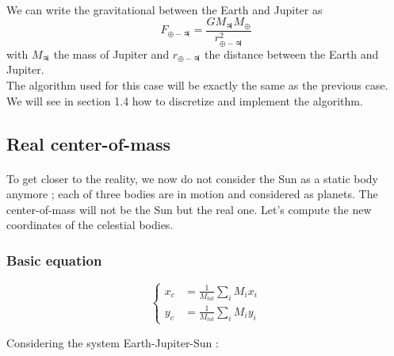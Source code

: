 \documentclass[a4paper, twoside, 11pt]{report}
\theoremstyle{theorem}
\theoremstyle{remark}
\theoremstyle{exemple}
\begin{document}
        \paragraph{}We can write the gravitational between the Earth and Jupiter as 
                \begin{equation*}
                    F_{\oplus-\jupiter} = \frac{GM_{\jupiter}M_{\oplus}}{r_{\oplus-\jupiter}^2} 
                \end{equation*}
            with $M_{\jupiter}$ the mass of Jupiter and $r_{\oplus - \jupiter}$ the distance between the Earth and Jupiter. \\
            The algorithm used for this case will be exactly the same as the previous case. We will see in section 1.4 how to discretize and implement the algorithm. 
            
        \subsection{Real center-of-mass}
        
            \paragraph{}To get closer to the reality, we now do not consider the Sun as a static body anymore ; each of three bodies are in motion and considered as planets. The center-of-mass will not be the Sun but the real one. Let's compute the new coordinates of the celestial bodies.
            
            \subsubsection{Basic equation}
            
                \begin{equation}
                    \left\{
                        \begin{aligned}
                    x_c &= \frac{1}{M_{tot}}\sum\limits_{i} M_i x_i\\
                    y_c &= \frac{1}{M_{tot}}\sum\limits_{i} M_i y_i
                \end{aligned}
                    \right.
                \end{equation} 
            
            Considering the system Earth-Jupiter-Sun :
            
\end{document}
